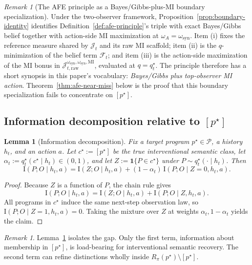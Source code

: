 \documentclass[11pt]{article}
\newtheorem{lemma}[theorem]{Lemma}
\theoremstyle{definition}
\theoremstyle{remark}
\newtheorem{remark}[theorem]{Remark}
\newcommand{\Pcal}{\mathcal{P}}
\newcommand{\Fcal}{\mathcal{F}}
\newcommand{\I}{\mathrm{I}}
\newcommand{\one}{\mathbf{1}}
\begin{document}
\begin{remark}[The AFE principle as a Bayes/Gibbs-plus-MI boundary specialization]
\label{rem:afe-as-functional-minimizer}
Under the two-observer framework, Proposition~\ref{prop:boundary-identity} identifies Definition~\ref{def:afe-principle}'s triple with exact Bayes/Gibbs belief together with action-side MI maximization at $\omega_A=\omega_{\mathrm{syn}}$. Item (i) fixes the reference measure shared by $\mathcal J_t$ and its raw MI scaffold; item (ii) is the $q$-minimization of the belief term $\Fcal_t$; and item (iii) is the action-side maximization of the MI bonus in $\mathcal J_{t,\mathrm{raw}}^{\omega_{\mathrm{syn}},\omega_{\mathrm{syn}},\mathrm{MI}}$, evaluated at $q=q_t^\star$. The principle therefore has a short synopsis in this paper's vocabulary: \emph{Bayes/Gibbs plus top-observer MI action}. Theorem~\ref{thm:afe-near-miss} below is the proof that this boundary specialization fails to concentrate on $[p^\star]$.
\end{remark}

\subsection{Information decomposition relative to $[p^\star]$}

\begin{lemma}[Information decomposition]
\label{lem:info-decomp}
Fix a target program $p^\star\in\Pcal$, a history $h_t$, and an action $a$. Let $c^\star:=[p^\star]$ be the true interventional semantic class, let $\alpha_t:=q_t^\star(c^\star\mid h_t)\in(0,1)$, and let $Z:=\one\{P\in c^\star\}$ under $P\sim q_t^\star(\cdot\mid h_t)$. Then
\[
\I(P;O\mid h_t,a)
=
\I(Z;O\mid h_t,a)+(1-\alpha_t)\,\I(P;O\mid Z=0,h_t,a).
\]
\end{lemma}

\begin{proof}
Because $Z$ is a function of $P$, the chain rule gives
\[
\I(P;O\mid h_t,a)=\I(Z;O\mid h_t,a)+\I(P;O\mid Z,h_t,a).
\]
All programs in $c^\star$ induce the same next-step observation law, so $\I(P;O\mid Z=1,h_t,a)=0$. Taking the mixture over $Z$ at weights $\alpha_t,1-\alpha_t$ yields the claim.
\end{proof}

\begin{remark}
Lemma~\ref{lem:info-decomp} isolates the gap. Only the first term, information about membership in $[p^\star]$, is load-bearing for interventional semantic recovery. The second term can refine distinctions wholly inside $R_\pi(p^\star)\setminus[p^\star]$.
\end{remark}
\end{document}
